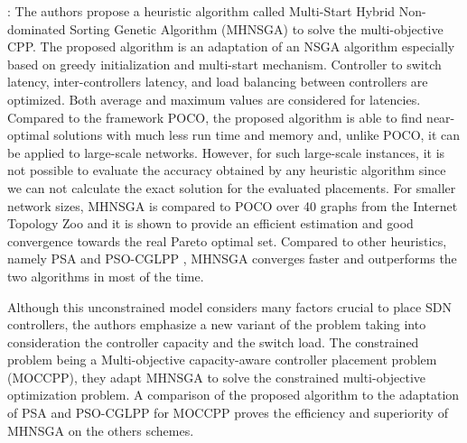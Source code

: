 \documentclass[a4paper,10pt]{article}
\begin{document}


\cite{VaMo18}: The authors propose a heuristic algorithm called Multi-Start Hybrid Non-dominated Sorting Genetic Algorithm (MHNSGA) to solve the multi-objective CPP. The proposed algorithm is an adaptation of an NSGA algorithm especially based on greedy initialization and multi-start mechanism. Controller to switch latency, inter-controllers latency, and load balancing between controllers are optimized. Both average and maximum values are considered for latencies. Compared to the framework POCO, the proposed algorithm is able to find near-optimal solutions with much less run time and memory and, unlike POCO, it can be applied to large-scale networks. However, for such large-scale instances, it is not possible to evaluate the accuracy obtained by any heuristic algorithm since we can not calculate the exact solution for the evaluated placements. For smaller network sizes, MHNSGA is compared to POCO over 40 graphs from the Internet Topology Zoo and it is shown to provide an efficient estimation and good convergence towards the real Pareto optimal set. Compared to other heuristics, namely PSA \cite{LaGe15} and PSO-CGLPP \cite{GaWa15}, MHNSGA converges faster and outperforms the two algorithms in most of the time.  

Although this unconstrained model considers many factors crucial to place SDN controllers, the authors emphasize a new variant of the problem taking into consideration the controller capacity and the switch load. The constrained problem being a Multi-objective capacity-aware controller placement problem (MOCCPP), they adapt MHNSGA to solve the constrained multi-objective optimization problem. A comparison of the proposed algorithm to the adaptation of PSA and  PSO-CGLPP for MOCCPP proves the efficiency and superiority of MHNSGA on the others schemes.
\end{document}
